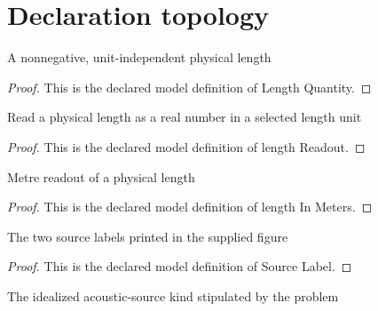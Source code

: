 \section{Declaration topology}
\begin{definition}
  \label{def:physics:phyx-mini-0312:phyxminiproblems-problemphyxmini0312-lengthquantity}
  A nonnegative, unit-independent physical length
\end{definition}
\begin{proof}
  This is the declared model definition of Length Quantity.
\end{proof}
\begin{definition}
  \label{def:physics:phyx-mini-0312:phyxminiproblems-problemphyxmini0312-lengthreadout}
  Read a physical length as a real number in a selected length unit
\end{definition}
\begin{proof}
  This is the declared model definition of length Readout.
\end{proof}
\begin{definition}
  \label{def:physics:phyx-mini-0312:phyxminiproblems-problemphyxmini0312-lengthinmeters}
  Metre readout of a physical length
\end{definition}
\begin{proof}
  This is the declared model definition of length In Meters.
\end{proof}
\begin{definition}
  \label{def:physics:phyx-mini-0312:phyxminiproblems-problemphyxmini0312-sourcelabel}
  The two source labels printed in the supplied figure
\end{definition}
\begin{proof}
  This is the declared model definition of Source Label.
\end{proof}
\begin{definition}
  \label{def:physics:phyx-mini-0312:phyxminiproblems-problemphyxmini0312-acousticsourcekind}
  The idealized acoustic-source kind stipulated by the problem
\end{definition}
